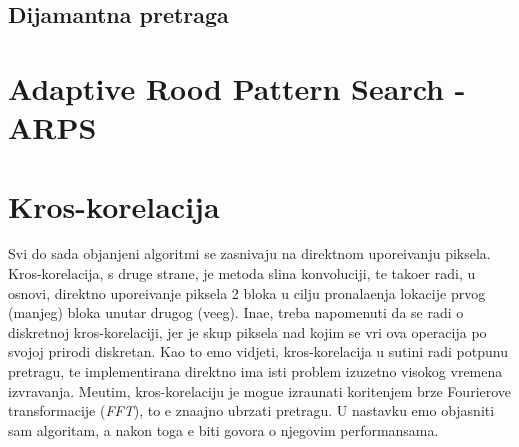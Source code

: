 \subsection{Dijamantna pretraga}

\section{Adaptive Rood Pattern Search - ARPS}

\section{Kros-korelacija} %
Svi do sada obja\sh njeni algoritmi se zasnivaju na direktnom upore\dj ivanju piksela. Kros-korelacija, s druge strane, je metoda sli\ch na konvoluciji, te tako\dj er radi, u osnovi, direktno upore\dj ivanje piksela 2 bloka u
cilju pronala\zh enja lokacije prvog (manjeg) bloka unutar drugog (ve\cj eg). Ina\ch e, treba napomenuti da se radi o diskretnoj kros-korelaciji, jer je skup piksela nad kojim se vr\sh i ova operacija po svojoj prirodi
diskretan. Kao \sh to \cj emo vidjeti, kros-korelacija u su\sh tini radi potpunu pretragu, te implementirana direktno ima isti problem izuzetno visokog vremena izvr\sh avanja. Me\dj utim, kros-korelaciju je mogu\cj e
izra\ch unati kori\sh tenjem brze Fourierove transformacije (\textit{FFT}), \sh to \cj e zna\ch ajno ubrzati pretragu. U nastavku \cj emo objasniti sam algoritam, a nakon toga \cj e biti govora o njegovim performansama.
